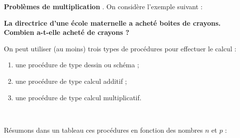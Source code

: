 {\bf Problèmes \og de multiplication \fg}. On considère l'exemple suivant :

\smallskip

\begin{cadre}[B2][J2]
   {\bf La directrice d'une école maternelle a acheté  boites de  crayons. Combien a-t-elle acheté de crayons ?}
\end{cadre}

\smallskip

On peut utiliser (au moins) trois types de procédures pour effectuer le calcul :
{\renewcommand{\StringDOCUMENTATION}{Les procédures}
\begin{documentation}
\begin{enumerate}
   \item une procédure de type dessin ou schéma ;
   \item une procédure de type calcul additif ;
   \item une procédure de type calcul multiplicatif. 
\end{enumerate}
\ \\ [-12mm]
\end{documentation}}

\bigskip

Résumons dans un tableau ces procédures en fonction des nombres $n$ et $p$ :

